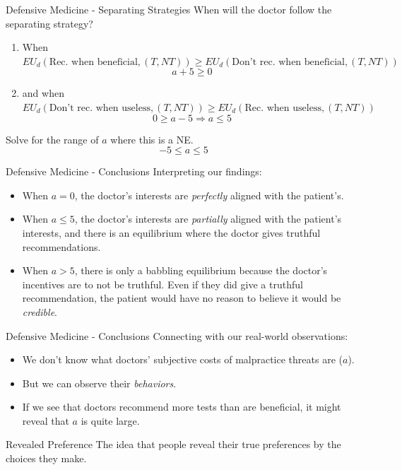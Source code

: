 

\begin{frame}{Defensive Medicine - Separating Strategies}
  When will the doctor follow the separating strategy?
  \begin{enumerate}
    \item When 
    $EU_d(\text{Rec. when beneficial}, (T,NT)) 
    \geq EU_d(\text{Don't rec. when beneficial}, (T,NT))$ 
    $$ a + 5 \geq 0 $$
    \item and when 
    $EU_d(\text{Don't rec. when useless}, (T,NT)) 
    \geq EU_d(\text{Rec. when useless}, (T,NT))$ 
    $$ 0 \geq a - 5 \Rightarrow a \leq 5 $$
  \end{enumerate}
  Solve for the range of $a$ where this is a NE.  
  $$ -5 \leq a \leq 5 $$
\end{frame}

\begin{frame}{Defensive Medicine - Conclusions}
  Interpreting our findings:
  \begin{itemize}
    \item 
    When $a=0$, the doctor's interests are \textit{perfectly} aligned 
    with the patient's.
    \item 
    When $a\leq5$, the doctor's interests are \textit{partially} aligned 
    with the patient's interests,
    and there is an equilibrium where the doctor gives truthful recommendations.
    \item 
    When $a>5$, there is only a babbling equilibrium
    because the doctor's incentives are to not be truthful.
    Even if they did give a truthful recommendation,
    the patient would have no reason to believe it would be \textit{credible}.
  \end{itemize}
\end{frame}


\begin{frame}{Defensive Medicine - Conclusions}
  Connecting with our real-world observations:
  \begin{itemize}
    \item 
    We don't know what doctors' subjective costs of malpractice threats are
    ($a$).
    \item 
    But we can observe their \textit{behaviors}.
    \item 
    If we see that doctors recommend more tests than are beneficial,
    it might reveal that $a$ is quite large. 
  \end{itemize}
  \begin{block}{Revealed Preference}
    The idea that people reveal their true preferences by the choices they make.
  \end{block}
\end{frame}




